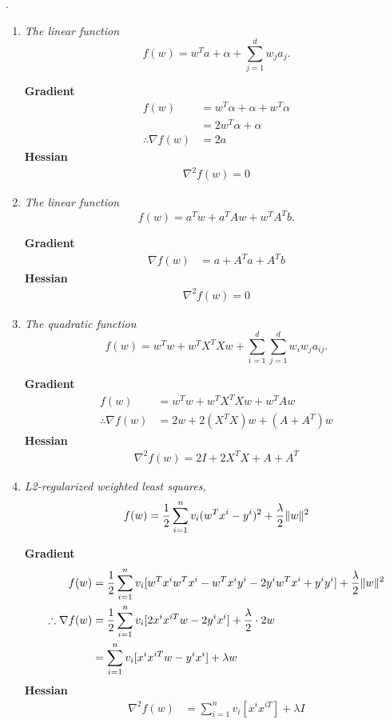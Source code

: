 .
\begin{enumerate}
	\item \textit{The linear function}
	$$f(w) = w^Ta + \alpha + \sum_{j=1}^d w_ja_j.$$
	
	\textbf{Gradient}
	\begin{align*}
		f(w) & = w^T\alpha + \alpha + w^T\alpha \\
		& = 2w^T \alpha + \alpha \\
		\therefore \nabla f(w) & = 2a
	\end{align*}
	\textbf{Hessian}
	\begin{align*}
		\nabla^2 f(w) = 0
	\end{align*}
	
	\item \textit{The linear function}
	$$f(w) = a^Tw + a^TAw + w^TA^Tb.$$

	\textbf{Gradient}
	\begin{align*}
		\nabla f(w) & = a + A^Ta + A^Tb
	\end{align*}
	\textbf{Hessian}
	\begin{align*}
		\nabla^2 f(w) = 0
	\end{align*}
	
	\item \textit{The quadratic function}
	$$f(w) = w^Tw + w^TX^TXw + \sum_{i=1}^d\sum_{j=1}^d w_iw_ja_{ij}.$$
	
	\textbf{Gradient}
	\begin{align*}
		f(w) & = w^Tw + w^TX^TXw + w^TAw	\\	
		\therefore \nabla f(w) & = 2w + 2(X^TX)w + (A+A^T)w
	\end{align*}
	\textbf{Hessian}
	\begin{align*}
		\nabla^2 f(w) = 2I + 2X^TX + A + A^T
	\end{align*}
	
	\item \textit{L2-regularized weighted least squares,}
	$$f(w) = \frac{1}{2}\sum_{i=1}^n v_i(w^Tx^i - y^i)^2 + \frac{\lambda}{2}\|w\|^2$$

	\textbf{Gradient}
	\begin{align*}
		f(w) & = \frac{1}{2} \sum_{i=1}^n v_i [w^Tx^iw^Tx^i - w^Tx^iy^i - 2y^iw^Tx^i + y^iy^i] + \frac{\lambda}{2}\|w\|^2 \\
		\therefore \nabla f(w) & = \frac{1}{2} \sum_{i=1}^n v_i [2x^ix^{iT}w - 2y^ix^i] + \frac{\lambda}{2} \cdot 2w \\
		& = \sum_{i=1}^n v_i [x^ix^{iT}w - y^ix^i] + \lambda w
	\end{align*}
	\textbf{Hessian}
	\begin{align*}
		\nabla^2 f(w) & = \sum_{i=1}^n v_i[x^ix^{iT}] + \lambda I
	\end{align*}
		

\end{enumerate}

